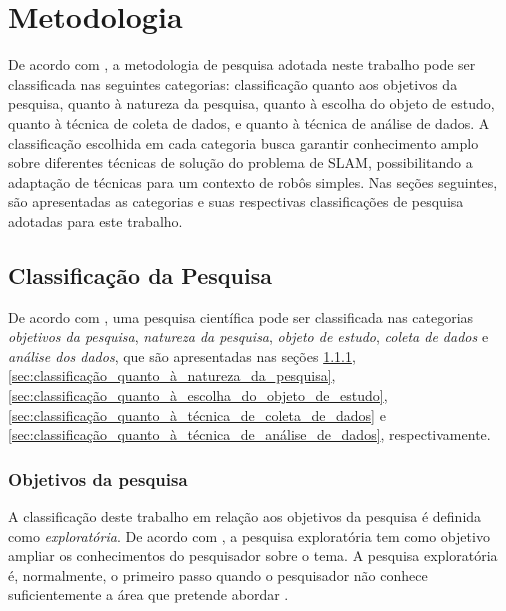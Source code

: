 \chapter[Metodologia]{Metodologia}

	De acordo com \cite{metodologiaCientifica}, a metodologia de pesquisa adotada neste trabalho pode ser classificada nas seguintes categorias: classificação quanto aos objetivos da pesquisa, quanto à natureza da pesquisa, quanto à escolha do objeto de estudo, quanto à técnica de coleta de dados, e quanto à técnica de análise de dados. A classificação escolhida em cada categoria busca garantir conhecimento amplo sobre diferentes técnicas de solução do problema de SLAM, possibilitando a adaptação de técnicas para um contexto de robôs simples. Nas seções seguintes, são apresentadas as categorias e suas respectivas classificações de pesquisa adotadas para este trabalho. 

	\section{Classificação da Pesquisa} %
	\label{sec:classificação_da_pesquisa}
		
		De acordo com \cite{metodologiaCientifica}, uma pesquisa científica pode ser classificada nas categorias \textit{objetivos da pesquisa}, \textit{natureza da pesquisa}, \textit{objeto de estudo}, \textit{coleta de dados} e \textit{análise dos dados}, que são apresentadas nas seções \ref{sec:classificação_quanto_aos_objetivos_da_pesquisa}, \ref{sec:classificação_quanto_à_natureza_da_pesquisa}, \ref{sec:classificação_quanto_à_escolha_do_objeto_de_estudo}, \ref{sec:classificação_quanto_à_técnica_de_coleta_de_dados} e \ref{sec:classificação_quanto_à_técnica_de_análise_de_dados}, respectivamente.

	\subsection{Objetivos da pesquisa} %
	\label{sec:classificação_quanto_aos_objetivos_da_pesquisa}
		
		A classificação deste trabalho em relação aos objetivos da pesquisa é definida como \textit{exploratória}. De acordo com \cite{metodologiaCientifica}, a pesquisa exploratória tem como objetivo ampliar os conhecimentos do pesquisador sobre o tema. A pesquisa exploratória é, normalmente, o primeiro passo quando o pesquisador não conhece suficientemente a área que pretende abordar \cite{metodologiaDaPesquisa}.

